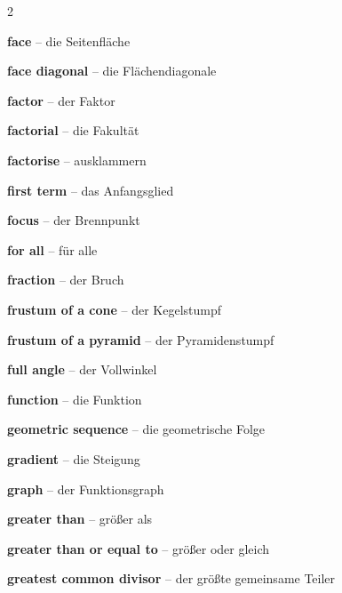 \begin{multicols}{2}
\par\nopagebreak
\textbf{face} -- die Seitenfläche\dotfill\hyperref[e:247]{\pageref*{e:247}}\par
\textbf{face diagonal} -- die Flächendiagonale\dotfill\hyperref[e:251]{\pageref*{e:251}}\par
\textbf{factor} -- der Faktor\dotfill\hyperref[e:23]{\pageref*{e:23}}\par
\textbf{factorial} -- die Fakultät\dotfill\hyperref[e:340]{\pageref*{e:340}}\par
\textbf{factorise} -- ausklammern\dotfill\hyperref[e:92]{\pageref*{e:92}}\par
\textbf{first term} -- das Anfangsglied\dotfill\hyperref[e:261]{\pageref*{e:261}}\par
\textbf{focus} -- der Brennpunkt\dotfill\hyperref[e:316]{\pageref*{e:316}}\par
\textbf{for all} -- für alle\dotfill\hyperref[e:352]{\pageref*{e:352}}\par
\textbf{fraction} -- der Bruch\dotfill\hyperref[e:28]{\pageref*{e:28}}\par
\textbf{frustum of a cone} -- der Kegelstumpf\dotfill\hyperref[e:236]{\pageref*{e:236}}\par
\textbf{frustum of a pyramid} -- der Pyramidenstumpf\dotfill\hyperref[e:235]{\pageref*{e:235}}\par
\textbf{full angle} -- der Vollwinkel\dotfill\hyperref[e:162]{\pageref*{e:162}}\par
\textbf{function} -- die Funktion\dotfill\hyperref[e:105]{\pageref*{e:105}}\par

\par\nopagebreak
\textbf{geometric sequence} -- die geometrische Folge\dotfill\hyperref[e:260]{\pageref*{e:260}}\par
\textbf{gradient} -- die Steigung\dotfill\hyperref[e:120]{\pageref*{e:120}}\par
\textbf{graph} -- der Funktionsgraph\dotfill\hyperref[e:111]{\pageref*{e:111}}\par
\textbf{greater than} -- größer als\dotfill\hyperref[e:64]{\pageref*{e:64}}\par
\textbf{greater than or equal to} -- größer oder gleich\dotfill\hyperref[e:66]{\pageref*{e:66}}\par
\textbf{greatest common divisor} -- der größte gemeinsame Teiler\dotfill\hyperref[e:56]{\pageref*{e:56}}\par


\end{multicols}

